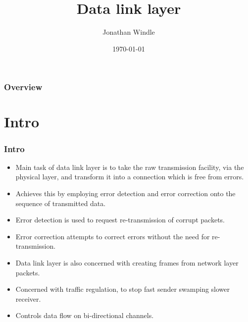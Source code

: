 \documentclass{beamer}
\title[Data link layer]{Data link layer} %
\author{Jonathan Windle} %
\institute[UEA] %
{
University of East Anglia \\ %
\medskip
\textit{J.Windle@uea.ac.uk} %
}
\date{\today} %
\begin{document}
\begin{frame}
\titlepage %
\end{frame}

\begin{frame}[allowframebreaks]
\frametitle{Overview} %
\tableofcontents %
\end{frame}

\section{Intro}
\begin{frame}
\frametitle{Intro}
\begin{itemize}
\item Main task of data link layer is to take the raw transmission facility, via the physical layer, and transform it into a connection which is free from errors.
\item Achieves this by employing error detection and error correction onto the sequence of transmitted data.
\item Error detection is used to request re-transmission of corrupt packets.
\item Error correction attempts to correct errors without the need for re-transmission.
\item Data link layer is also concerned with creating frames from network layer packets.
\item Concerned with traffic regulation, to stop fast sender swamping slower receiver.
\item Controls data flow on bi-directional channels.
\end{itemize}
\end{frame}
\end{document}

